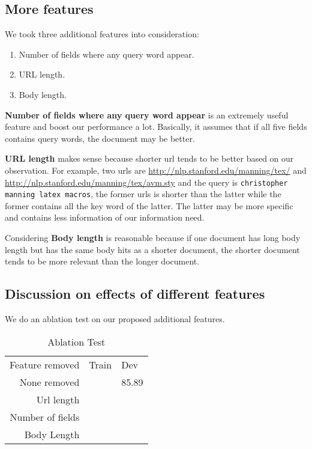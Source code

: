 \documentclass{article}
\begin{document}
\subsection{More features}

We took three additional features into consideration:

\begin{enumerate}
    \item Number of fields where any query word appear.
    \item URL length.
    \item Body length.
\end{enumerate}

\textbf{Number of fields where any query word appear} is an extremely useful feature and boost our performance a lot. Basically, it assumes that if all five fields contains query words, the document may be better.

\textbf{URL length} makes sense because shorter url tends to be better based on our observation. For example, two urls are \url{http://nlp.stanford.edu/manning/tex/} and \url{http://nlp.stanford.edu/manning/tex/avm.sty} and the query is \texttt{christopher manning latex macros}, the former urls is shorter than the latter while the former contains all the key word of the latter. The latter may be more specific and contains less information of our information need.

Considering \textbf{Body length} is reasonable because if one document has long body length but has the same body hits as a shorter document, the shorter document tends to be more relevant than the longer document.

\subsection{Discussion on effects of different features}

We do an ablation test on our proposed additional features.

\begin{table}[!htb]
    \centering
    \begin{tabular}{| r | l | l |}
        \hline
        Feature removed & Train & Dev \\
        None removed & & 85.89 \\
        \hline
        Url length & & \\
        \hline
        Number of fields & & \\
        \hline
        Body Length & & \\
        \hline
    \end{tabular}
    \caption{Ablation Test}
    \label{table:ablation}
\end{table}
\end{document}
